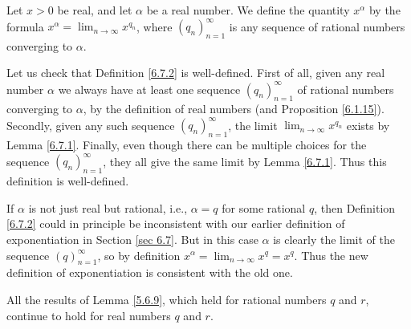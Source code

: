 \begin{definition}\label{6.7.2}
    Let \(x > 0\) be real, and let \(\alpha\) be a real number.
    We define the quantity \(x^\alpha\) by the formula \(x^\alpha = \lim_{n \to \infty} x^{q_n}\), where \((q_n)_{n = 1}^\infty\) is any sequence of rational numbers converging to \(\alpha\).
\end{definition}

\begin{note}
    Let us check that Definition \ref{6.7.2} is well-defined.
    First of all, given any real number \(\alpha\) we always have at least one sequence \((q_n)_{n = 1}^\infty\) of rational numbers converging to \(\alpha\), by the definition of real numbers (and Proposition \ref{6.1.15}).
    Secondly, given any such sequence \((q_n)_{n = 1}^\infty\), the limit \(\lim_{n \to \infty} x^{q_n}\) exists by Lemma \ref{6.7.1}.
    Finally, even though there can be multiple choices for the sequence \((q_n)_{n = 1}^\infty\), they all give the same limit by Lemma \ref{6.7.1}.
    Thus this definition is well-defined.
\end{note}

\begin{note}
    If \(\alpha\) is not just real but rational, i.e., \(\alpha = q\) for some rational \(q\), then Definition \ref{6.7.2} could in principle be inconsistent with our earlier definition of exponentiation in Section \ref{sec 6.7}.
    But in this case \(\alpha\) is clearly the limit of the sequence \((q)_{n = 1}^\infty\), so by definition \(x^\alpha = \lim_{n \to \infty} x^q = x^q\).
    Thus the new definition of exponentiation is consistent with the old one.
\end{note}

\begin{proposition}\label{6.7.3}
    All the results of Lemma \ref{5.6.9}, which held for rational numbers \(q\) and \(r\), continue to hold for real numbers \(q\) and \(r\).
\end{proposition}

